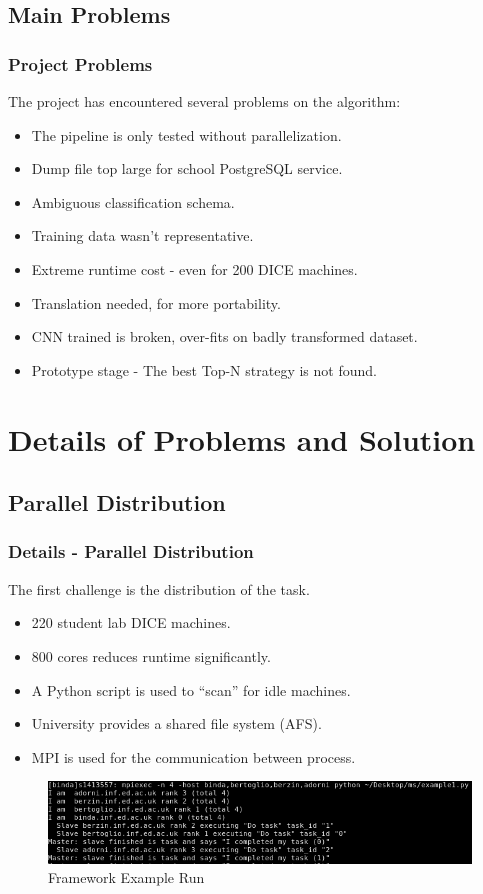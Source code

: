 \documentclass{beamer}[fullspacing]
\begin{document}
\subsection{Main Problems}

\begin{frame}
\frametitle{Project Problems}

The project has encountered several problems on the algorithm:
\begin{itemize}
\item
The pipeline is only tested without parallelization.
\item
Dump file top large for school PostgreSQL service.
\item
Ambiguous classification schema.
\item
Training data wasn't representative.
\item
Extreme runtime cost - even for 200 DICE machines.
\item
Translation needed, for more portability.
\item
CNN trained is broken, over-fits on badly transformed dataset. 
\item
Prototype stage - The best Top-N strategy is not found.
\end{itemize}

\end{frame}



\section{Details of Problems and Solution}
\subsection{Parallel Distribution}

\begin{frame}
\frametitle{Details - Parallel Distribution}

The first challenge is the distribution of the task.
\begin{itemize}
\item
220 student lab DICE machines.
\item
800 cores reduces runtime significantly.
\item
A Python script is used to ``scan'' for idle machines.
\item
University provides a shared file system (AFS).
\item
MPI is used for the communication between process.
\end{itemize}

\begin{figure}
\includegraphics[scale=0.4]{image/mpi.png}
\caption{Framework Example Run}
\end{figure}

\end{frame}
\end{document}
